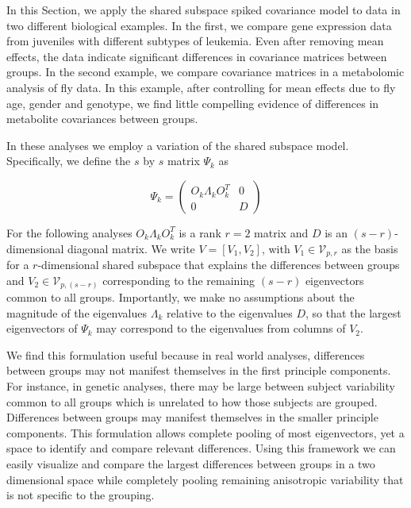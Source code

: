 \documentclass[12pt]{article}
\begin{document}
In this Section, we apply the shared subspace spiked covariance model to data in two
different biological examples.  In the first, we compare gene
expression data from juveniles with different subtypes of leukemia.  Even
after removing mean effects, the data indicate significant differences
in covariance matrices between groups.  In the second example, we
compare covariance matrices in a metabolomic analysis of fly data.  In
this example, after controlling for mean effects due to fly age, gender and
genotype, we find little compelling evidence of differences in metabolite
covariances between groups. 

In these analyses we employ a variation of the shared
subspace model.  Specifically, we define the $s$ by $s$ matrix $\Psi_k$ as

\begin{equation}
\Psi_k =\left( \begin{array}{cc}
O_k\Lambda_kO_k^T & 0  \\
0 & D  \end{array} \right)
\end{equation}

For the following analyses $O_k\Lambda_kO_k^T$ is a rank $r=2$ matrix
and $D$ is an $(s-r)$-dimensional diagonal matrix.  We write
$V = [V_1, V_2]$, with $V_1 \in \mathcal{V}_{p,r}$ as the basis for a
$r$-dimensional shared subspace that explains the differences between
groups and $V_2 \in \mathcal{V}_{p,(s-r)}$ corresponding to the remaining $(s-r)$
eigenvectors common to all groups.  Importantly, we make no assumptions about the
magnitude of the eigenvalues $\Lambda_k$ relative to the eigenvalues
$D$, so that the largest eigenvectors of $\Psi_k$ may correspond to
the eigenvalues from columns of $V_2$.  

We find this formulation useful because in real world analyses,
differences between groups may not manifest themselves in the first
principle components.  For instance, in genetic analyses, there may be
large between subject variability common to all groups which is
unrelated to how those subjects are grouped. Differences between
groups may manifest themselves in the smaller principle
components. This formulation allows complete pooling of most
eigenvectors, yet a space to identify and compare relevant
differences.  Using this framework we can easily visualize and compare the
largest differences between groups in a two dimensional space while
completely pooling remaining anisotropic variability that is not
specific to the grouping.
\end{document}
